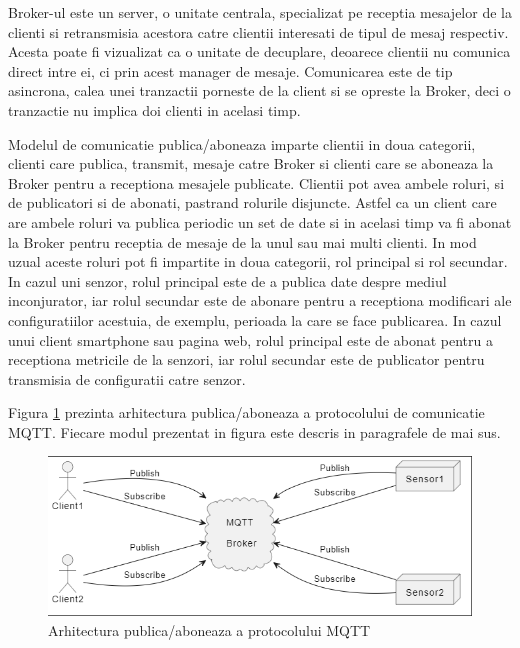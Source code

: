 Broker-ul este un server, o unitate centrala, specializat pe receptia mesajelor de la clienti si retransmisia acestora catre clientii interesati de 
tipul de mesaj respectiv. Acesta poate fi vizualizat ca o unitate de decuplare, deoarece clientii nu comunica direct intre ei, ci prin acest manager de 
mesaje. Comunicarea este de tip asincrona, calea unei tranzactii porneste de la client si se opreste la Broker, deci o tranzactie nu implica doi clienti 
in acelasi timp. 

Modelul de comunicatie publica/aboneaza imparte clientii in doua categorii, clienti care publica, transmit, mesaje catre Broker si clienti care se aboneaza
la Broker pentru a receptiona mesajele publicate. Clientii pot avea ambele roluri, si de publicatori si de abonati, pastrand rolurile disjuncte. Astfel ca 
un client care are ambele roluri va publica periodic un set de date si in acelasi timp va fi abonat la Broker pentru receptia de mesaje de la unul sau mai 
multi clienti. In mod uzual aceste roluri pot fi impartite in doua categorii, rol principal si rol secundar. In cazul uni senzor, rolul principal este 
de a publica date despre mediul inconjurator, iar rolul secundar este de abonare pentru a receptiona modificari ale configuratiilor acestuia, de exemplu, 
perioada la care se face publicarea. In cazul unui client smartphone sau pagina web, rolul principal este de abonat pentru a receptiona metricile de la senzori, 
iar rolul secundar este de publicator pentru transmisia de configuratii catre senzor.

Figura \ref{fig:MQTTBrokerArchitecture} prezinta arhitectura publica/aboneaza a protocolului de comunicatie MQTT. Fiecare modul prezentat in figura este 
descris in paragrafele de mai sus.
\begin{figure}[H]
    \centering
    \includegraphics[scale=0.8]{figs/MQTTBrokerArchitecture.png}
    \caption{Arhitectura publica/aboneaza a protocolului MQTT}
    \label{fig:MQTTBrokerArchitecture}
\end{figure}

